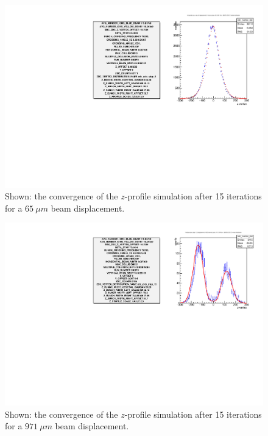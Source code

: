 \begin{figure}
  \centering
  \includegraphics[width=\textwidth]{./figures/65_micron_step.pdf}
  \caption{
    Shown: the convergence of the $z$-profile simulation after 15 iterations for
    a $65~\mu m$ beam displacement. 
  }
  \label{fig:profile_1}
\end{figure}

\begin{figure}
  \centering
  \includegraphics[width=\textwidth]{./figures/971_micron_step.pdf}
  \caption{
    Shown: the convergence of the $z$-profile simulation after 15 iterations for
    a $971~\mu m$ beam displacement. 
  }
  \label{fig:profile_2}
\end{figure}

